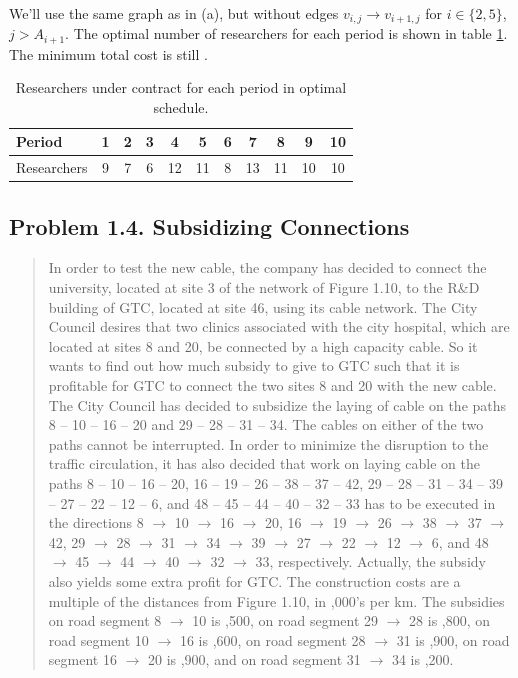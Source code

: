 \paragraph{}
We'll use the same graph as in (a), but without edges $v_{i, j} \rightarrow v_{i+1, j}$ for $i \in \{2, 5\}$, $j > A_{i+1}$. The optimal number of researchers for each period is shown in table \ref{researchers-1-3b}. The minimum total cost is still .

\begin{table}[H]
\centering
\begin{tabular}{lcccccccccc}
\hline
Period & 1 & 2 & 3 & 4 & 5 & 6 & 7 & 8 & 9 & 10 \\ \hline
Researchers & 9 & 7 & 6 & 12 & 11 & 8 & 13 & 11 & 10 & 10 \\ \hline
\end{tabular}
\caption{Researchers under contract for each period in optimal schedule.}
\label{researchers-1-3b}
\end{table}

\subsection{Problem 1.4. Subsidizing Connections}

\begin{quote}
In order to test the new cable, the company has decided to connect the university, located at site 3 of the network of Figure 1.10, to the R&D building of GTC, located at site 46, using its cable network.
The City Council desires that two clinics associated with the city hospital, which are located at sites 8 and 20, be connected by a high capacity cable. So it wants to find out how much subsidy to give to GTC such that it is profitable for GTC to connect the two sites 8 and 20 with the new cable.
The City Council has decided to subsidize the laying of cable on the paths 8 – 10 – 16 – 20 and 29 – 28 – 31 – 34. The cables on either of the two paths cannot be interrupted. In order to minimize the disruption to the traffic circulation, it has also decided that work on laying cable on the paths 8 – 10 – 16 – 20, 16 – 19 – 26 – 38 – 37 – 42, 29 – 28 – 31 – 34 – 39 – 27 – 22 – 12 – 6, and 48 – 45 – 44 – 40 – 32 – 33 has to be executed in the directions 8 $\rightarrow$ 10 $\rightarrow$ 16 $\rightarrow$ 20, 16 $\rightarrow$ 19 $\rightarrow$ 26 $\rightarrow$ 38 $\rightarrow$ 37 $\rightarrow$ 42, 29 $\rightarrow$ 28 $\rightarrow$ 31 $\rightarrow$ 34 $\rightarrow$ 39 $\rightarrow$ 27 $\rightarrow$ 22 $\rightarrow$ 12 $\rightarrow$ 6, and 48 $\rightarrow$ 45  $\rightarrow$ 44 $\rightarrow$ 40 $\rightarrow$ 32 $\rightarrow$ 33, respectively. Actually, the subsidy also yields some extra profit for GTC. The construction costs are a multiple of the distances from Figure 1.10, in ,000’s per km. The subsidies on road segment 8 $\rightarrow$ 10 is ,500, on road segment 29 $\rightarrow$ 28 is ,800, on road segment 10 $\rightarrow$ 16 is ,600, on road segment 28 $\rightarrow$ 31 is ,900, on road segment 16 $\rightarrow$ 20 is ,900, and on road segment 31 $\rightarrow$ 34 is ,200.
\end{quote}

